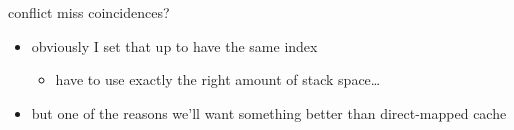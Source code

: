 \begin{frame}{conflict miss coincidences?}
\begin{itemize}
\item obviously I set that up to have the same index 
    \begin{itemize}
    \item have to use exactly the right amount of stack space\ldots
    \end{itemize}
\item but one of the reasons we'll want something better
    than direct-mapped cache
\end{itemize}
\end{frame}
